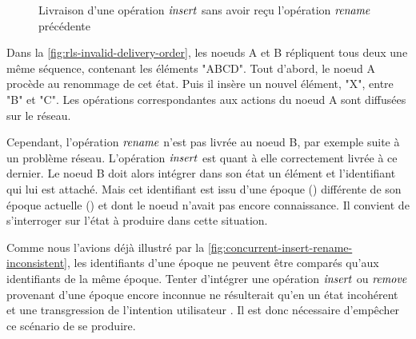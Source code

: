 \begin{figure}[!ht]
{
  }
  \caption{Livraison d'une opération $\mathit{insert}$ sans avoir reçu l'opération $\mathit{rename}$ précédente}
  \label{fig:rls-invalid-delivery-order}
\end{figure}

Dans la \autoref{fig:rls-invalid-delivery-order}, les noeuds A et B répliquent tous deux une même séquence, contenant les éléments "ABCD".
Tout d'abord, le noeud A procède au renommage de cet état.
Puis il insère un nouvel élément, "X", entre "B" et "C".
Les opérations correspondantes aux actions du noeud A sont diffusées sur le réseau.

Cependant, l'opération $\mathit{rename}$ n'est pas livrée au noeud B, par exemple suite à un problème réseau.
L'opération $\mathit{insert}$ est quant à elle correctement livrée à ce dernier.
Le noeud B doit alors intégrer dans son état un élément et l'identifiant qui lui est attaché.
Mais cet identifiant est issu d'une époque () différente de son époque actuelle () et dont le noeud n'avait pas encore connaissance.
Il convient de s'interroger sur l'état à produire dans cette situation.

Comme nous l'avions déjà illustré par la \autoref{fig:concurrent-insert-rename-inconsistent}, les identifiants d'une époque ne peuvent être comparés qu'aux identifiants de la même époque.
Tenter d'intégrer une opération $\mathit{insert}$ ou $\mathit{remove}$ provenant d'une époque encore inconnue ne résulterait qu'en un état incohérent et une transgression de l'intention utilisateur .
Il est donc nécessaire d'empêcher ce scénario de se produire.

